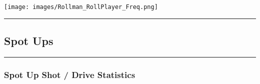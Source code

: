 \documentclass[a4paper,12pt]{article}
\begin{document}
\begin{table}[H]
{\begin{minipage}[t]{0.6\textwidth}
{\begin{tabular}
{{{{{{{{{{{{            \bottomrule
        \end{tabular}
        } %
    \end{minipage}
    } %
    \hfill %
    \begin{minipage}[c]{0.35\textwidth} %
        \flushright
        \texttt{[image: images/Rollman\_RollPlayer\_Freq.png]} %
    \end{minipage}
\end{table}

\vspace{-1em} %
\hrule height 1pt width 1\textwidth %
\vspace{1em} %

\clearpage

\subsection{Spot Ups}

\vspace{1em} %
\hrule height 1pt width 1\textwidth %
\vspace{0em} %

\subsubsection{Spot Up Shot / Drive Statistics}
\end{document}
